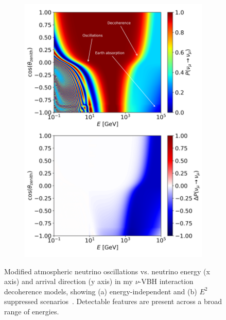 \documentclass[a4paper,11pt]{article}
\begin{document}
\begin{figure}
\begin{subfigure}[b]{0.5\textwidth}
    \includegraphics[trim=0.0cm 12.7cm 0.cm 0.2cm, clip=true, width=\linewidth]{images/atmo_oscillogram_randomize_flavor_n2_matter.png}
    \caption{\label{fig:mDOM_noise}}
    \end{subfigure}
    \caption{Modified atmospheric neutrino oscillations vs. neutrino energy (x axis) and arrival direction (y axis) in my $\nu$-VBH interaction decoherence models, showing (a) energy-independent and (b) $E^2$ suppressed scenarios~\cite{PhysRevD.102.115003}. Detectable features are present across a broad range of energies.}
\end{figure}

\end{document}
